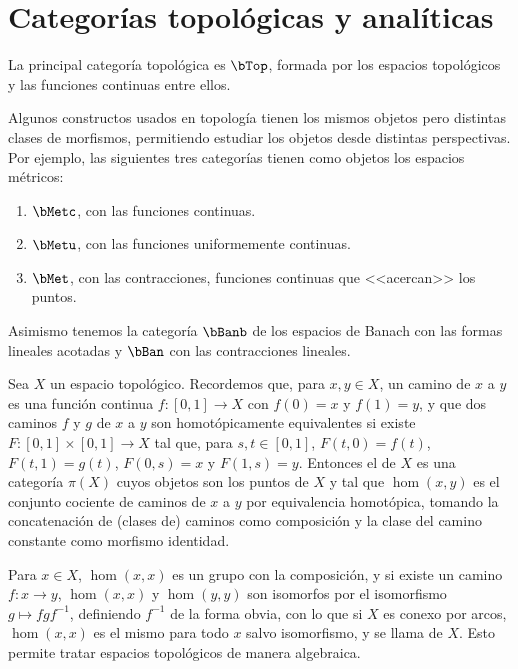 \section{Categorías topológicas y analíticas}

La principal categoría topológica es $\bTop$, formada por los espacios
topológicos y las funciones continuas entre ellos.

\begin{example}
  Algunos constructos usados en topología tienen los mismos objetos pero
  distintas clases de morfismos, permitiendo estudiar los objetos desde
  distintas perspectivas. Por ejemplo, las siguientes tres categorías tienen
  como objetos los espacios métricos:
  \begin{enumerate}
  \item $\bMetc$, con las funciones continuas.
  \item $\bMetu$, con las funciones uniformemente continuas.
  \item $\bMet$, con las contracciones, funciones continuas que <<acercan>> los
    puntos.
  \end{enumerate}
  Asimismo tenemos la categoría $\bBanb$ de los espacios de Banach con las formas
  lineales acotadas y $\bBan$ con las contracciones lineales.
\end{example}


\begin{example}
  Sea $X$ un espacio topológico.  Recordemos que, para $x,y\in X$, un camino de
  $x$ a $y$ es una función continua $f:[0,1]\to X$ con $f(0)=x$ y $f(1)=y$, y
  que dos caminos $f$ y $g$ de $x$ a $y$ son homotópicamente equivalentes si
  existe $F:[0,1]\times[0,1]\to X$ tal que, para $s,t\in[0,1]$, $F(t,0)=f(t)$,
  $F(t,1)=g(t)$, $F(0,s)=x$ y $F(1,s)=y$. Entonces el \cite[p. 20]{maclane} de $X$ es una categoría $\pi(X)$ cuyos
  objetos son los puntos de $X$ y tal que $\hom(x,y)$ es el conjunto cociente de
  caminos de $x$ a $y$ por equivalencia homotópica, tomando la concatenación de
  (clases de) caminos como composición y la clase del camino constante como
  morfismo identidad.

  Para $x\in X$, $\hom(x,x)$ es un grupo con la composición, y si existe un
  camino $f:x\to y$, $\hom(x,x)$ y $\hom(y,y)$ son isomorfos por el isomorfismo
  $g\mapsto fgf^{-1}$, definiendo $f^{-1}$ de la forma obvia, con lo que si $X$
  es conexo por arcos, $\hom(x,x)$ es el mismo para todo $x$ salvo
  isomorfismo, y se llama  de $X$. Esto permite tratar
  espacios topológicos de manera algebraica.
\end{example}

